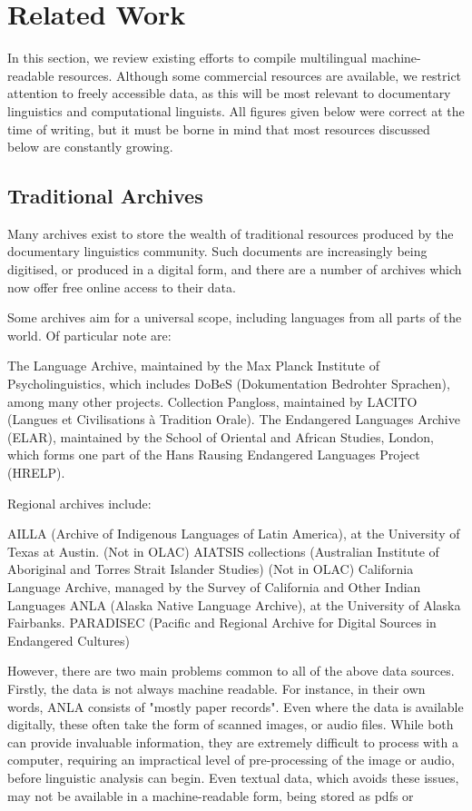 \section{Related Work} \label{sec:related}

In this section, we review existing efforts to compile multilingual machine-readable resources.  Although some commercial resources are available, we restrict attention to freely accessible data, as this will be most relevant to documentary linguistics and computational linguists.  All figures given below were correct at the time of writing, but it must be borne in mind that most resources discussed below are constantly growing.

\subsection{Traditional Archives}

Many archives exist to store the wealth of traditional resources produced by the documentary linguistics community.  Such documents are increasingly being digitised, or produced in a digital form, and there are a number of archives which now offer free online access to their data.

Some archives aim for a universal scope, including languages from all parts of the world.  Of particular note are:

The Language Archive, maintained by the Max Planck Institute of Psycholinguistics, which includes DoBeS (Dokumentation Bedrohter Sprachen), among many other projects.
Collection Pangloss, maintained by LACITO (Langues et Civilisations à Tradition Orale).
The Endangered Languages Archive (ELAR), maintained by the School of Oriental and African Studies, London, which forms one part of the Hans Rausing Endangered Languages Project (HRELP).

Regional archives include:

AILLA (Archive of Indigenous Languages of Latin America), at the University of Texas at Austin. (Not in OLAC)
AIATSIS collections (Australian Institute of Aboriginal and Torres Strait Islander Studies) (Not in OLAC)
California Language Archive, managed by the Survey of California and Other Indian Languages
ANLA (Alaska Native Language Archive), at the University of Alaska Fairbanks.
PARADISEC (Pacific and Regional Archive for Digital Sources in Endangered Cultures)

However, there are two main problems common to all of the above data sources.  Firstly, the data is not always machine readable.  For instance, in their own words, ANLA consists of "mostly paper records".  Even where the data is available digitally, these often take the form of scanned images, or audio files.  While both can provide invaluable information, they are extremely difficult to process with a computer, requiring an impractical level of pre-processing of the image or audio, before linguistic analysis can begin.  Even textual data, which avoids these issues, may not be available in a machine-readable form, being stored as pdfs or 


